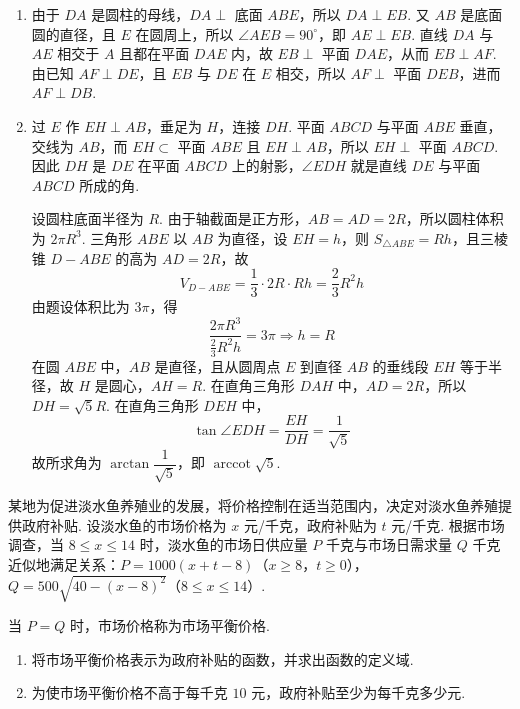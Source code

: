 \documentclass[UTF8,a4paper,oneside,11pt]{ctexbook}
\begin{document}
\begin{solution}
\begin{enumerate}
\item 由于 \(DA\) 是圆柱的母线，\(DA\perp\) 底面 \(ABE\)，所以 \(DA\perp EB\). 又 \(AB\) 是底面圆的直径，且 \(E\) 在圆周上，所以 \(\angle AEB=90^\circ\)，即 \(AE\perp EB\). 直线 \(DA\) 与 \(AE\) 相交于 \(A\) 且都在平面 \(DAE\) 内，故 \(EB\perp\) 平面 \(DAE\)，从而 \(EB\perp AF\). 由已知 \(AF\perp DE\)，且 \(EB\) 与 \(DE\) 在 \(E\) 相交，所以 \(AF\perp\) 平面 \(DEB\)，进而 \(AF\perp DB\).

\item 过 \(E\) 作 \(EH\perp AB\)，垂足为 \(H\)，连接 \(DH\). 平面 \(ABCD\) 与平面 \(ABE\) 垂直，交线为 \(AB\)，而 \(EH\subset\) 平面 \(ABE\) 且 \(EH\perp AB\)，所以 \(EH\perp\) 平面 \(ABCD\). 因此 \(DH\) 是 \(DE\) 在平面 \(ABCD\) 上的射影，\(\angle EDH\) 就是直线 \(DE\) 与平面 \(ABCD\) 所成的角.

设圆柱底面半径为 \(R\). 由于轴截面是正方形，\(AB=AD=2R\)，所以圆柱体积为 \(2\pi R^3\). 三角形 \(ABE\) 以 \(AB\) 为直径，设 \(EH=h\)，则 \(S_{\triangle ABE}=R h\)，且三棱锥 \(D-ABE\) 的高为 \(AD=2R\)，故
\[
V_{D-ABE}=\frac13\cdot2R\cdot Rh=\frac23R^2h
\]
由题设体积比为 \(3\pi\)，得
\[
\frac{2\pi R^3}{\frac23R^2h}=3\pi\Longrightarrow h=R
\]
在圆 \(ABE\) 中，\(AB\) 是直径，且从圆周点 \(E\) 到直径 \(AB\) 的垂线段 \(EH\) 等于半径，故 \(H\) 是圆心，\(AH=R\). 在直角三角形 \(DAH\) 中，\(AD=2R\)，所以 \(DH=\sqrt5R\). 在直角三角形 \(DEH\) 中，
\[
\tan\angle EDH=\frac{EH}{DH}=\frac1{\sqrt5}
\]
故所求角为 \(\arctan\dfrac1{\sqrt5}\)，即 \(\operatorname{arccot}\sqrt5\).
\end{enumerate}
\end{solution}

\begin{problem}
某地为促进淡水鱼养殖业的发展，将价格控制在适当范围内，决定对淡水鱼养殖提供政府补贴. 设淡水鱼的市场价格为 \(x\) 元/千克，政府补贴为 \(t\) 元/千克. 根据市场调查，当 \(8 \leqslant x \leqslant 14\) 时，淡水鱼的市场日供应量 \(P\) 千克与市场日需求量 \(Q\) 千克近似地满足关系：\(P = 1000(x + t - 8)\)（\(x \geqslant 8\)，\(t \geqslant 0\)），\(Q = 500\sqrt{40 - (x - 8)^2}\)（\(8 \leqslant x \leqslant 14\)）.

当 \(P = Q\) 时，市场价格称为市场平衡价格.

\begin{enumerate}
\item 将市场平衡价格表示为政府补贴的函数，并求出函数的定义域.

\item 为使市场平衡价格不高于每千克 \(10\) 元，政府补贴至少为每千克多少元.
\end{enumerate}
\end{problem}
\end{document}
